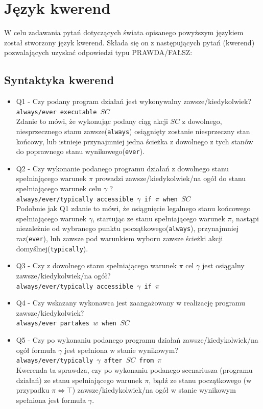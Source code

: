 \documentclass{article}
\begin{document}
\newpage
\section{Język kwerend}
W celu zadawania pytań dotyczących świata opisanego powyższym językiem został stworzony język kwerend. Składa się on z następujących pytań (kwerend) pozwalających uzyskać odpowiedzi typu PRAWDA/FAŁSZ:

\subsection{Syntaktyka kwerend}
\begin{itemize}
\item Q1 - Czy podany program działań jest wykonywalny zawsze/kiedykolwiek?\\
{\large\texttt{always/ever executable $SC$}} \\
Zdanie to mówi, że wykonując podany ciąg akcji $SC$ z dowolnego, niesprzecznego stanu zawsze(\texttt{always}) osiągnięty zostanie niesprzeczny stan końcowy, lub istnieje przynajmniej jedna ścieżka z dowolnego z tych stanów do poprawnego stanu wynikowego(\texttt{ever}).


\item Q2 - Czy wykonanie podanego programu działań z dowolnego stanu spełniającego warunek $\pi$ prowadzi zawsze/kiedykolwiek/na ogół do stanu spełniającego warunek celu $\gamma$ ?\\
{\large\texttt{always/ever/typically accessible $\gamma$ if $\pi$ when $SC$}} \\
Podobnie jak Q1 zdanie to mówi, że osiągnięcie legalnego stanu końcowego spełniającego warunek $\gamma$, startując ze stanu spełniającego warunek $\pi$, nastąpi niezależnie od wybranego punktu początkowego(\texttt{always}), przynajmniej raz(\texttt{ever}), lub zawsze pod warunkiem wyboru zawsze ścieżki akcji domyślnej(\texttt{typically}).



\item Q3 - Czy z dowolnego stanu spełniającego warunek $\pi$ cel $\gamma$ jest osiągalny zawsze/kiedykolwiek/na ogół?\\
{\large\texttt{always/ever/typically accessible $\gamma$ if $\pi$}}


\item Q4 - Czy wskazany wykonawca jest zaangażowany w realizację programu zawsze/kiedykolwiek?\\
{\large\texttt{always/ever partakes $w$ when $SC$}} 

\item Q5 - Czy po wykonaniu podanego programu działań zawsze/kiedykolwiek/na ogół formuła $\gamma$ jest spełniona w stanie wynikowym?\\
{\large\texttt{always/ever/typically $\gamma$ after $SC$ from $\pi$}} \\
Kwerenda ta sprawdza, czy po wykonaniu podanego scenariusza (programu działań) ze stanu spełniającego warunek $\pi$, bądź ze stanu początkowego (w przypadku $\pi \Leftrightarrow \top$) zawsze/kiedykolwiek/na ogół w stanie wynikowym spełniona jest formuła $\gamma$.
\end{itemize}
\newpage
\end{document}
